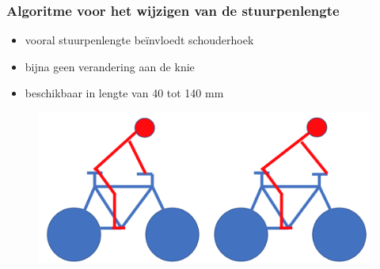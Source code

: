 \documentclass
   [kulak] %
   {kulakbeamer}
\begin{document}
\begin{frame}
	\frametitle{Algoritme voor het wijzigen van de stuurpenlengte}
	\begin{itemize}
		\item vooral stuurpenlengte beïnvloedt schouderhoek
		\item bijna geen verandering aan de knie
		\item beschikbaar in lengte van 40 tot 140 \si{mm}
	\end{itemize}
	\begin{figure}
		\includegraphics[width= \textwidth]{stuur.png}
	\end{figure}
\end{frame}
\end{document}
